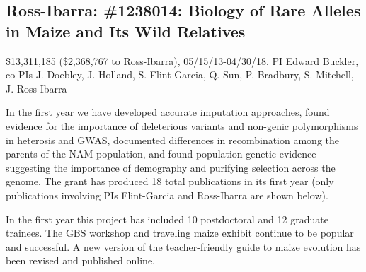
\subsection*{Ross-Ibarra: \#1238014: Biology of Rare Alleles in Maize and Its Wild Relatives}
\$13,311,185 (\$2,368,767 to Ross-Ibarra), 05/15/13-04/30/18. PI Edward Buckler, co-PIs J. Doebley, J. Holland, S. Flint-Garcia, Q. Sun, P. Bradbury, S. Mitchell, J. Ross-Ibarra\\
\par{} In the first year we have developed accurate imputation approaches, found evidence for the importance of deleterious variants and non-genic polymorphisms in heterosis and GWAS, documented differences in recombination among the parents of the NAM population, and found population genetic evidence suggesting the importance of demography and purifying selection across the genome.  The grant has produced 18 total publications in its first year (only publications involving PIs Flint-Garcia and Ross-Ibarra are shown below).\\
\par{}  In the first year this project has included 10 postdoctoral and 12 graduate trainees. The GBS workshop and traveling maize exhibit continue to be popular and successful. A new version of the teacher-friendly guide to maize evolution has been revised and published online.\\
\par{} \citet{peiffer2013genetic, Romay2013, wills2013many, Mezmouk2014, Peiffer2014, sood2014mining}

